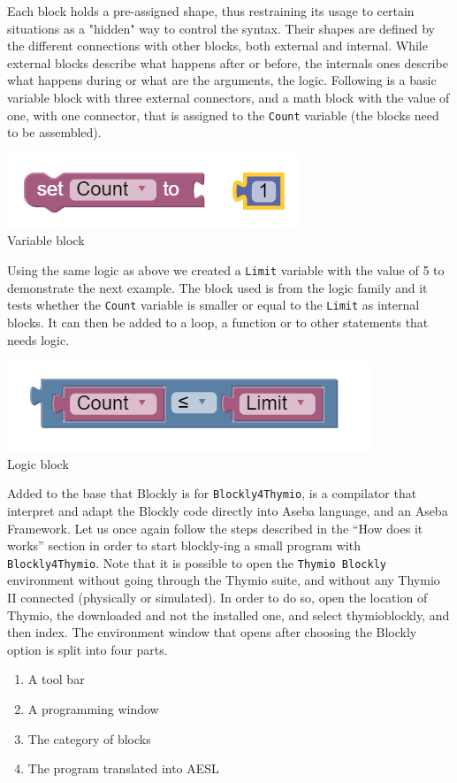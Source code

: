 \documentclass{scrreprt}
\begin{document}
Each block holds a pre-assigned shape, thus restraining its usage to certain situations as a "hidden" way to control the syntax. Their shapes are defined by the different connections with other blocks, 
both external and internal. While external blocks describe what happens after or before, the internals ones describe what happens during or what are the arguments, the logic. 
Following is a basic variable block with three external connectors, and a math block with the value of one, with one connector, that is assigned to the \texttt{Count} variable (the blocks need to be assembled). \\
\begin{center}
  \includegraphics[scale=0.5]{./Blockly/basic_variable}\\
  Variable block
\end{center}

Using the same logic as above we created a \texttt{Limit} variable with the value of 5 to demonstrate the next example. 
The block used is from the logic family and it tests whether the \texttt{Count} variable is smaller or equal to the \texttt{Limit} as internal blocks. 
It can then be added to a loop, a function or to other statements that needs logic.\\
\begin{center}
  \includegraphics[scale=0.5]{./Blockly/basic_logic}\\
  Logic block
\end{center}

Added to the base that Blockly is for \texttt{Blockly4Thymio}, is a compilator that interpret and adapt the Blockly code directly into Aseba language, and an Aseba Framework. 
Let us once again follow the steps described in the “How does it works” section in order to start blockly-ing a small program with \texttt{Blockly4Thymio}. 
Note that it is possible to open the \texttt{Thymio Blockly} environment without going through the Thymio suite, and without any Thymio II connected (physically or simulated). 
In order to do so, open the location of Thymio, the downloaded and not the installed one, and select thymio\textunderscore blockly, and then index.
The environment window that opens after choosing the Blockly option is split into four parts.
\begin{enumerate}
  \item A tool bar
  \item A programming window
  \item The category of blocks
  \item The program translated into AESL
\end{enumerate}
\end{document}
